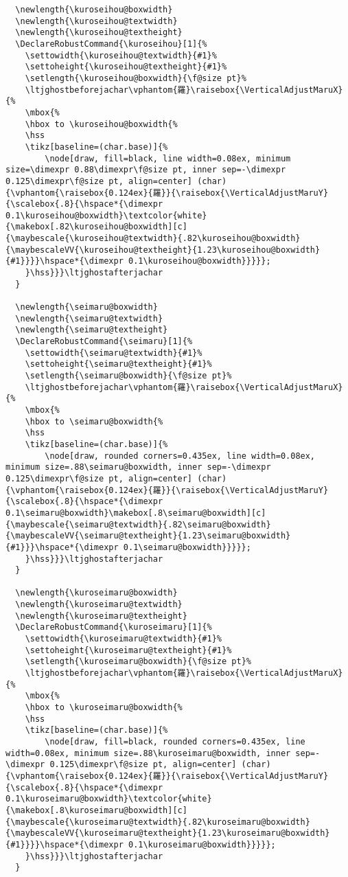 \documentclass[luatex,fontsize=10pt,paper=b5,twoside]{jlreq}%
\begin{document}
\begin{lstlisting}
  \newlength{\kuroseihou@boxwidth}
  \newlength{\kuroseihou@textwidth}
  \newlength{\kuroseihou@textheight}
  \DeclareRobustCommand{\kuroseihou}[1]{%
    \settowidth{\kuroseihou@textwidth}{#1}%
    \settoheight{\kuroseihou@textheight}{#1}%
    \setlength{\kuroseihou@boxwidth}{\f@size pt}%
    \ltjghostbeforejachar\vphantom{羅}\raisebox{\VerticalAdjustMaruX}{%
    \mbox{%
    \hbox to \kuroseihou@boxwidth{%
    \hss
    \tikz[baseline=(char.base)]{%
        \node[draw, fill=black, line width=0.08ex, minimum size=\dimexpr 0.88\dimexpr\f@size pt, inner sep=-\dimexpr 0.125\dimexpr\f@size pt, align=center] (char) {\vphantom{\raisebox{0.124ex}{羅}}{\raisebox{\VerticalAdjustMaruY}{\scalebox{.8}{\hspace*{\dimexpr 0.1\kuroseihou@boxwidth}\textcolor{white}{\makebox[.82\kuroseihou@boxwidth][c]{\maybescale{\kuroseihou@textwidth}{.82\kuroseihou@boxwidth}{\maybescaleVV{\kuroseihou@textheight}{1.23\kuroseihou@boxwidth}{#1}}}}\hspace*{\dimexpr 0.1\kuroseihou@boxwidth}}}}};
    }\hss}}}\ltjghostafterjachar
  }

  \newlength{\seimaru@boxwidth}
  \newlength{\seimaru@textwidth}
  \newlength{\seimaru@textheight}
  \DeclareRobustCommand{\seimaru}[1]{%
    \settowidth{\seimaru@textwidth}{#1}%
    \settoheight{\seimaru@textheight}{#1}%
    \setlength{\seimaru@boxwidth}{\f@size pt}%
    \ltjghostbeforejachar\vphantom{羅}\raisebox{\VerticalAdjustMaruX}{%
    \mbox{%
    \hbox to \seimaru@boxwidth{%
    \hss
    \tikz[baseline=(char.base)]{%
        \node[draw, rounded corners=0.435ex, line width=0.08ex, minimum size=.88\seimaru@boxwidth, inner sep=-\dimexpr 0.125\dimexpr\f@size pt, align=center] (char) {\vphantom{\raisebox{0.124ex}{羅}}{\raisebox{\VerticalAdjustMaruY}{\scalebox{.8}{\hspace*{\dimexpr 0.1\seimaru@boxwidth}\makebox[.8\seimaru@boxwidth][c]{\maybescale{\seimaru@textwidth}{.82\seimaru@boxwidth}{\maybescaleVV{\seimaru@textheight}{1.23\seimaru@boxwidth}{#1}}}\hspace*{\dimexpr 0.1\seimaru@boxwidth}}}}};
    }\hss}}}\ltjghostafterjachar
  }

  \newlength{\kuroseimaru@boxwidth}
  \newlength{\kuroseimaru@textwidth}
  \newlength{\kuroseimaru@textheight}
  \DeclareRobustCommand{\kuroseimaru}[1]{%
    \settowidth{\kuroseimaru@textwidth}{#1}%
    \settoheight{\kuroseimaru@textheight}{#1}%
    \setlength{\kuroseimaru@boxwidth}{\f@size pt}%
    \ltjghostbeforejachar\vphantom{羅}\raisebox{\VerticalAdjustMaruX}{%
    \mbox{%
    \hbox to \kuroseimaru@boxwidth{%
    \hss
    \tikz[baseline=(char.base)]{%
        \node[draw, fill=black, rounded corners=0.435ex, line width=0.08ex, minimum size=.88\kuroseimaru@boxwidth, inner sep=-\dimexpr 0.125\dimexpr\f@size pt, align=center] (char) {\vphantom{\raisebox{0.124ex}{羅}}{\raisebox{\VerticalAdjustMaruY}{\scalebox{.8}{\hspace*{\dimexpr 0.1\kuroseimaru@boxwidth}\textcolor{white}{\makebox[.8\kuroseimaru@boxwidth][c]{\maybescale{\kuroseimaru@textwidth}{.82\kuroseimaru@boxwidth}{\maybescaleVV{\kuroseimaru@textheight}{1.23\kuroseimaru@boxwidth}{#1}}}}\hspace*{\dimexpr 0.1\kuroseimaru@boxwidth}}}}};
    }\hss}}}\ltjghostafterjachar
  }


\end{lstlisting}
\end{document}
